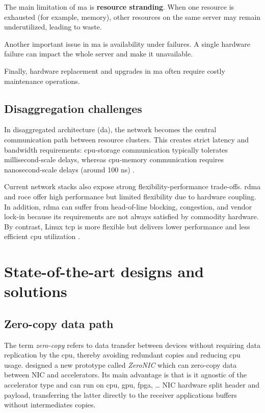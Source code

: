 The main limitation of \acrfull{ma} is \textbf{resource stranding}. When one resource is exhausted (for example, memory), other resources on the same server may remain underutilized, leading to waste.

Another important issue in \acrfull{ma} is availability under failures. A single hardware failure can impact the whole server and make it unavailable.

Finally, hardware replacement and upgrades in \acrfull{ma} often require costly maintenance operations.

\subsection{Disaggregation challenges}

In disaggregated architecture (\acrfull{da}), the network becomes the central communication path between resource clusters. This creates strict latency and bandwidth requirements: \acrshort{cpu}-storage communication typically tolerates millisecond-scale delays, whereas \acrshort{cpu}-memory communication requires nanosecond-scale delays (around 100 ns) \cite{lin_disaggregated_2020}.

Current network stacks also expose strong flexibility-performance trade-offs. \acrshort{rdma} and \acrfull{roce} offer high performance but limited flexibility due to hardware coupling. In addition, \acrshort{rdma} can suffer from head-of-line blocking, congestion, and vendor lock-in because its requirements are not always satisfied by commodity hardware. By contrast, Linux \acrshort{tcp} is more flexible but delivers lower performance and less efficient \acrshort{cpu} utilization \cite{skiadopoulos_high-throughput_2024}.


\section{State-of-the-art designs and solutions} \label{sec:sota}

\subsection{Zero-copy data path}

The term \textit{zero-copy} refers to data transfer between devices without requiring data replication by the
\acrshort{cpu}, thereby avoiding redundant copies and reducing \acrshort{cpu} usage.  designed a new prototype called \textit{ZeroNIC} which can zero-copy data between NIC and accelerators. Its main advantage is that is it agnostic of the accelerator type and can run on \acrshort{cpu}, \acrshort{gpu}, \acrshort{fpga}, …
NIC hardware split header and payload, transferring the latter directly to the receiver applications buffers without intermediates
copies.

